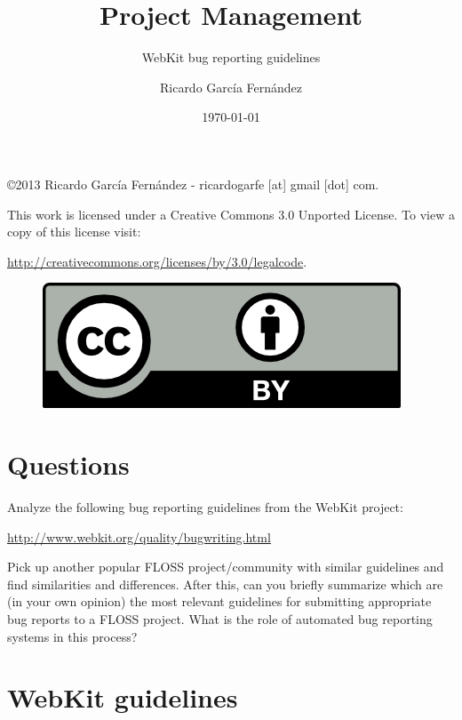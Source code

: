 \documentclass[11pt]{scrartcl}
\title{\textbf{Project Management}}
\subtitle{WebKit bug reporting guidelines}
\author{Ricardo Garc\'ia Fern\'andez}
\date{\today}
\begin{document}
\maketitle

\vfill

\begin{flushright}
    \copyright  2013 Ricardo Garc\'ia Fern\'andez - ricardogarfe [at] gmail [dot] com.

    This work is licensed under a Creative Commons 3.0 Unported License.
    To view a copy of this license visit:
 
    \url{http://creativecommons.org/licenses/by/3.0/legalcode}.
\end{flushright}

\begin{figure}[h]
    \begin{flushright}	
        \includegraphics{by}
        \label{fig:by}
    \end{flushright}
\end{figure}

\newpage

\section{Questions}

\par Analyze the following bug reporting guidelines from the WebKit project:

\url{http://www.webkit.org/quality/bugwriting.html} 

\par Pick up another popular FLOSS project/community with similar guidelines and find similarities and differences. After this, can you briefly summarize which are (in your own opinion) the most relevant guidelines for submitting appropriate bug reports to a FLOSS project. What is the role of automated bug reporting systems in this process?

\section{WebKit guidelines}
\label{sec:webkit-guidelines}
\end{document}
